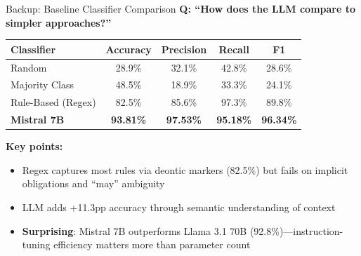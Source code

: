 \documentclass[aspectratio=169, 10pt]{beamer}
\begin{document}
\begin{frame}{Backup: Baseline Classifier Comparison}
    \textbf{Q: ``How does the LLM compare to simpler approaches?''}

    \vspace{0.3cm}
    \begin{table}[]
        \centering
        \begin{tabular}{lcccc}
            \toprule
            \textbf{Classifier} & \textbf{Accuracy} & \textbf{Precision} & \textbf{Recall} & \textbf{F1} \\
            \midrule
            Random & 28.9\% & 32.1\% & 42.8\% & 28.6\% \\
            Majority Class & 48.5\% & 18.9\% & 33.3\% & 24.1\% \\
            Rule-Based (Regex) & 82.5\% & 85.6\% & 97.3\% & 89.8\% \\
            \midrule
            \textbf{Mistral 7B} & \textbf{93.81\%} & \textbf{97.53\%} & \textbf{95.18\%} & \textbf{96.34\%} \\
            \bottomrule
        \end{tabular}
    \end{table}

    \vspace{0.3cm}
    \textbf{Key points:}
    \begin{itemize}
        \item Regex captures most rules via deontic markers (82.5\%) but fails on implicit obligations and ``may'' ambiguity
        \item LLM adds +11.3pp accuracy through semantic understanding of context
        \item \textbf{Surprising}: Mistral 7B outperforms Llama 3.1 70B (92.8\%)---instruction-tuning efficiency matters more than parameter count
    \end{itemize}
\end{frame}
\end{document}
